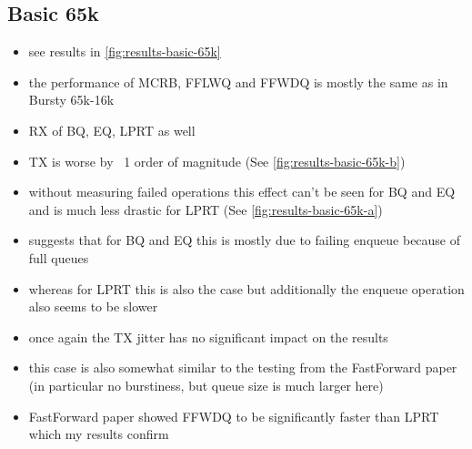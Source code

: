 \subsection{Basic 65k}
\begin{itemize}
    \item see results in \autoref{fig:results-basic-65k}
    \item the performance of MCRB, FFLWQ and FFWDQ is mostly the same as in Bursty 65k-16k
    \item RX of BQ, EQ, LPRT as well
    \item TX is worse by ~1 order of magnitude (See \autoref{fig:results-basic-65k-b})
    \item without measuring failed operations this effect can't be seen for BQ and EQ and is much less drastic for LPRT (See \autoref{fig:results-basic-65k-a})
    \item suggests that for BQ and EQ this is mostly due to failing enqueue because of full queues
    \item whereas for LPRT this is also the case but additionally the enqueue operation also seems to be slower
    \item once again the TX jitter has no significant impact on the results
    \item this case is also somewhat similar to the testing from the FastForward paper (in particular no burstiness, but queue size is much larger here)
    \item FastForward paper showed FFWDQ to be significantly faster than LPRT which my results confirm
\end{itemize}
